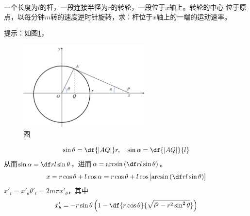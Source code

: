 % 

\bs
\egz 一个长度为$l$的杆，一段连接半径为$r$的转轮，一段位于$x$轴上。转轮的中心
位于原点，以每分钟$m$转的速度逆时针旋转，求：杆位于$x$轴上的一端的运动速率。


提示：如图\ref{fig:rollbar}，
\begin{figure}[h]
	\centering
	\includegraphics[width=0.6\textwidth]
	{./Images/Ch02/rollbar.pdf}
	\caption{\exNo 图}
	\label{fig:rollbar}
\end{figure}
$$\sin\theta=\df{|AQ|}r,\quad \sin\alpha=\df{|AQ|}{l}$$
从而$\sin\alpha=\df rl\sin\theta$，进而$\alpha=\arcsin\left(
\df rl\sin\theta\right)$。
$$x=r\cos\theta+l\cos\alpha=r\cos\theta+l\cos
\left[\arcsin\left(\df rl\sin\theta\right)\right]$$
$x'_t=x'_{\theta}\theta'_t=2m\pi x'_{\theta}$，其中
$$x'_{\theta}
=-r\sin\theta\left(1-\df{r\cos\theta}{\sqrt{l^2-r^2\sin^2\theta}}\right)$$

